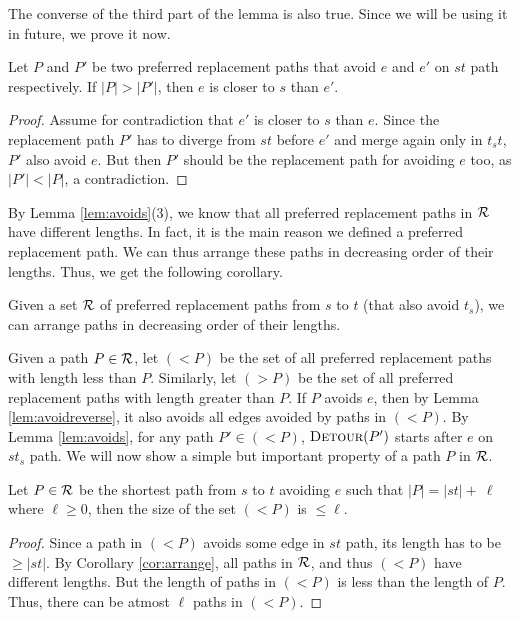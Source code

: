 \noindent The converse of the third part of the lemma is also true. Since we will be using it in future, we prove it now.

\begin{lemma}
\label{lem:avoidreverse}

Let   $P$ and $P'$ be two preferred replacement paths that avoid $e$ and $e'$ on $st$ path respectively. If $|P| > |P'|$, then $e$ is closer to $s$ than $e'$.
\end{lemma}

\iflong
  \begin{proof}
  Assume for contradiction that $e'$ is closer to $s$ than $e$. Since the replacement path $P'$ has to diverge from $st$ before $e'$ and merge again only in $t_st$,  $P'$ also avoid $e$. But then $P'$ should be the replacement path for avoiding $e$ too, as $|P'| < |P|$, a  contradiction.
  \end{proof}
\fi
\iflong
\else

\fi
\noindent By Lemma \ref{lem:avoids}{\small(3)}, we know that all preferred replacement
paths in $\mathcal{R}$ have different lengths. In fact, it is the main reason we defined a preferred replacement path. We can thus arrange
these paths   in decreasing order of their lengths. Thus, we get the following corollary.
\begin{corollary}
\label{cor:arrange}
 Given a set $\mathcal{R}$ of preferred replacement paths from $s$ to $t$ (that also avoid $t_s$), we can arrange  paths in decreasing order of their lengths.
\end{corollary}

\noindent Given a path $P \in \mathcal{R}$, let $(<P)$ be the set of all preferred replacement paths with length less than $P$. Similarly, let $(>P)$ be the set of all preferred replacement paths with length greater than $P$.   If $P$ avoids $e$, then by Lemma \ref{lem:avoidreverse}, it also avoids all  edges avoided by paths in $(<P)$.  By Lemma \ref{lem:avoids}, for any path $P' \in (<P)$, $\textsc{Detour}(P')$ starts after $e$ on $st_s$ path.
We will now show a simple but important property of a path $P$ in $\mathcal{R}$.

\begin{lemma}
\label{lem:length}
Let $P \in \mathcal{R}$ be the shortest path from $s$ to $t$ avoiding $e$ such that $|P| = |st| +\ \ell$ where $\ell \ge 0$, then the size of the set $(<P)$ is $\le \ell$.
\end{lemma}
\iflong
  \begin{proof}
  Since a path in $(<P)$ avoids some edge in $st$ path, its length has to be $\ge |st|$. By Corollary \ref{cor:arrange},
  all paths in $\mathcal{R}$, and thus $(<P)$ have different lengths. But the length of paths in $(<P)$ is less than the length of $P$.
  Thus, there can be atmost $\ell$ paths in $(<P)$.
  \end{proof}
\fi

